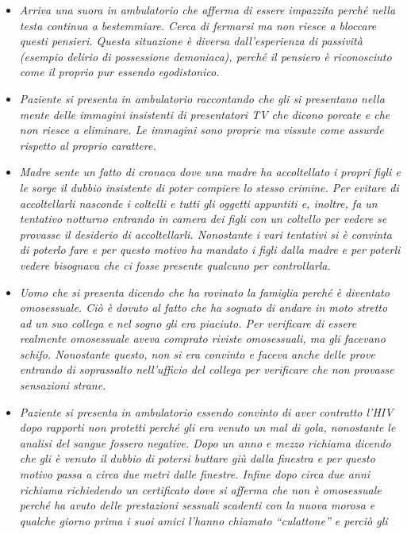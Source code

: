 \begin{itemize}
\item
  \emph{Arriva una suora in ambulatorio che afferma di essere impazzita
  perché nella testa continua a bestemmiare. Cerca di fermarsi ma non
  riesce a bloccare questi pensieri. Questa situazione è diversa
  dall'esperienza di passività (esempio delirio di possessione
  demoniaca), perché il pensiero è riconosciuto come il proprio pur
  essendo egodistonico.}
\item
  \emph{Paziente si presenta in ambulatorio raccontando che gli si
  presentano nella mente delle immagini insistenti di presentatori TV
  che dicono porcate e che non riesce a eliminare. Le immagini sono
  proprie ma vissute come assurde rispetto al proprio carattere.}
\item
  \emph{Madre sente un fatto di cronaca dove una madre ha accoltellato i
  propri figli e le sorge il dubbio insistente di poter compiere lo
  stesso crimine. Per evitare di accoltellarli nasconde i coltelli e
  tutti gli oggetti appuntiti e, inoltre, fa un tentativo notturno
  entrando in camera dei figli con un coltello per vedere se provasse il
  desiderio di accoltellarli. Nonostante i vari tentativi si è convinta
  di poterlo fare e per questo motivo ha mandato i figli dalla madre e
  per poterli vedere bisognava che ci fosse presente qualcuno per
  controllarla.}
\item
  \emph{Uomo che si presenta dicendo che ha rovinato la famiglia perché
  è diventato omosessuale. Ciò è dovuto al fatto che ha sognato di
  andare in moto stretto ad un suo collega e nel sogno gli era piaciuto.
  Per verificare di essere realmente omosessuale aveva comprato riviste
  omosessuali, ma gli facevano schifo. Nonostante questo, non si era
  convinto e faceva anche delle prove entrando di soprassalto
  nell'ufficio del collega per verificare che non provasse sensazioni
  strane.}
\item
  \emph{Paziente si presenta in ambulatorio essendo convinto di aver
  contratto l'HIV dopo rapporti non protetti perché gli era venuto un
  mal di gola, nonostante le analisi del sangue fossero negative. Dopo
  un anno e mezzo richiama dicendo che gli è venuto il dubbio di potersi
  buttare giù dalla finestra e per questo motivo passa a circa due metri
  dalle finestre. Infine dopo circa due anni richiama richiedendo un
  certificato dove si afferma che non è omosessuale perché ha avuto
  delle prestazioni sessuali scadenti con la nuova morosa e qualche
  giorno prima i suoi amici l'hanno chiamato ``culattone'' e perciò gli
}
\end{itemize}
